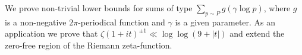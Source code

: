 \documentclass{article}
\begin{document}
  We prove non-trivial lower bounds for sums of
  type $\sum_{p\sim P}g(\gamma\log p)$, where $g$ is a non-negative $2\pi$-periodical
  function and $\gamma$ is a given parameter. As an application we prove that
  $\zeta(1+it)^{\pm1}\ll\log\log (9+|t|)$ and extend the zero-free region of
  the Riemann zeta-function.
\end{document}
